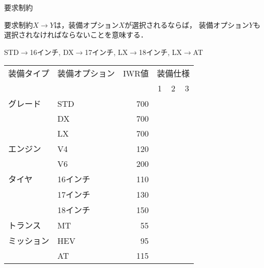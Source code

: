 \documentclass[dvipdfmx, 11pt,]{beamer}
\begin{document}
\appendix
\begin{frame}{要求制約}
 \begin{alertblock}{}
  要求制約$X\longrightarrow Y$は，装備オプション$X$が選択されるならば，
  装備オプション$Y$も選択されなければならないことを意味する．
 \end{alertblock}
 \begin{center}
  STD$\longrightarrow$16インチ,\quad
  DX$\longrightarrow$17インチ,\quad
  LX$\longrightarrow$18インチ,\quad
  LX$\longrightarrow$AT
 \end{center}
 \begin{exampleblock}{}\small
  \centering
  \begin{tabular}{l|l|r|c|c|c} %
   装備タイプ	& 装備オプション 	& IWR値	& \multicolumn{3}{c}{装備仕様} \\\cline{4-6}
                &		&	& 1	& 2	& 3	\\\cline{1-6}
   グレード 	& STD 		& 700	& \OK	&	&	\\\cline{2-6}
                & DX 		& 700	&	& \OK	&	\\\cline{2-6}	
                & LX 		& 700	& 	&	& \OK	\\\cline{1-6}
   エンジン	& V4 		& 120	&	&	& \OK	\\\cline{2-6}
                & V6 		& 200	& \OK	& \OK	& \\\cline{1-6}
   タイヤ	& 16インチ	& 110	&  \OK	&	&	\\\cline{2-6}
                & 17インチ 	& 130	&	& \OK	&	\\\cline{2-6}
                & 18インチ 	& 150	& &	& \OK	\\\cline{1-6}
   トランス	& MT		& 55	&	 &  &	\\\cline{2-6}
   ミッション	& HEV 	        & 95	& \OK	& \OK	&	\\\cline{2-6}
                & AT 		& 115	&	& 	& \OK %
  \end{tabular}
 \end{exampleblock}
\end{frame}

\end{document}
